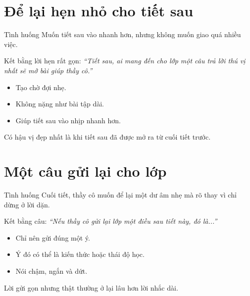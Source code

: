 \section{Để lại hẹn nhỏ cho tiết sau}
\begin{tinhhuong}{Tình huống}
Muốn tiết sau vào nhanh hơn, nhưng không muốn giao quá nhiều việc.
\end{tinhhuong}
\begin{goiydungngay}
Kết bằng lời hẹn rất gọn: \textit{``Tiết sau, ai mang đến cho lớp một câu trả lời thú vị nhất sẽ mở bài giúp thầy cô.''}
\begin{itemize}
\item Tạo chờ đợi nhẹ.
\item Không nặng như bài tập dài.
\item Giúp tiết sau vào nhịp nhanh hơn.
\end{itemize}
\end{goiydungngay}
\begin{cauchot}
Có hậu vị đẹp nhất là khi tiết sau đã được mở ra từ cuối tiết trước.
\end{cauchot}
\ngancach

\section{Một câu gửi lại cho lớp}
\begin{tinhhuong}{Tình huống}
Cuối tiết, thầy cô muốn để lại một dư âm nhẹ mà rõ thay vì chỉ dừng ở lời dặn.
\end{tinhhuong}
\begin{goiydungngay}
Kết bằng câu: \textit{``Nếu thầy cô gửi lại lớp một điều sau tiết này, đó là...''}
\begin{itemize}
\item Chỉ nên gửi đúng một ý.
\item Ý đó có thể là kiến thức hoặc thái độ học.
\item Nói chậm, ngắn và dứt.
\end{itemize}
\end{goiydungngay}
\begin{cauchot}
Lời gửi gọn nhưng thật thường ở lại lâu hơn lời nhắc dài.
\end{cauchot}
\ngancach

